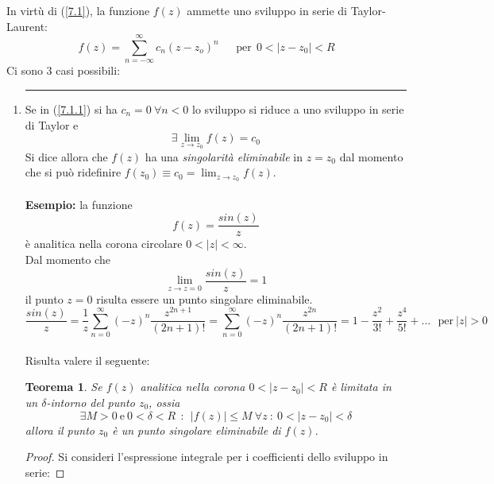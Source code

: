 \documentclass[twoside]{article}
\newtheorem{theorem}{Teorema}[section]
\begin{document}
In virtù di (\ref{7.1}), la funzione $f(z)$ ammette uno sviluppo in serie di Taylor-Laurent:
\begin{equation} \label{7.1.1}
    f(z)=\sum_{n=-\infty}^{\infty}c_n(z-z_o)^n \ \ \ \ \ \ \ \text{per} \ \   0<|z-z_0|<R
\end{equation}
Ci sono 3 casi possibili:
\begin{enumerate}
    \item
    \rule{\textwidth}{0.7pt}
    Se in (\ref{7.1.1}) si ha $c_n=0 \ \forall n<0$ lo sviluppo si riduce a uno sviluppo in serie di Taylor e 
    \begin{equation}
        \exists \lim_{z \to z_0} f(z)=c_0
    \end{equation}
    Si dice allora che $f(z)$ ha una \textit{singolarità eliminabile} in $z=z_0$ dal momento che si può ridefinire $f(z_0)\equiv c_0=\lim_{z\to z_0}f(z)$.
    \\ \\
    \textbf{Esempio:} la funzione
    \begin{equation}
        f(z)=\frac{sin(z)}{z}
    \end{equation}
    è analitica nella corona circolare $0<|z|<\infty$.
    \\
    Dal momento che 
    \begin{equation}
        \lim_{z\to z=0}\frac{sin(z)}{z}=1
    \end{equation}
    il punto $z=0$ risulta essere un punto singolare eliminabile.
    \\
    \begin{equation}
        \frac{sin(z)}{z}=\frac{1}{z}\sum_{n=0}^{\infty}(-z)^n\frac{z^{2n+1}}{(2n+1)!}=\sum_{n=0}^{\infty}(-z)^n\frac{z^{2n}}{(2n+1)!}=1-\frac{z^2}{3!}+\frac{z^4}{5!}+... \ \ \ \text{per} \ |z|>0
    \end{equation}
    \\ 
    Risulta valere il seguente:
    \begin{theorem}
    Se $f(z)$ analitica nella corona $0<|z-z_0|<R$ è limitata in un $\delta$-intorno del punto $z_0$, ossia
    \begin{equation}
        \exists M>0 \ \text{e} \ 0<\delta<R \ \ : \ \ |f(z)|\leq M \ \forall z \ : \ 0<|z-z_0|<\delta
    \end{equation}
    allora il punto $z_0$ è un punto singolare eliminabile di $f(z)$.
    \end{theorem}
    \begin{proof}
    Si consideri l'espressione integrale per i coefficienti dello sviluppo in serie:

\end{proof}
\end{enumerate}
\end{document}
